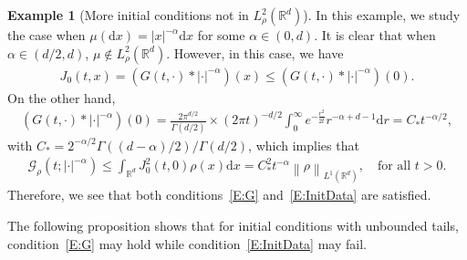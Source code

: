 \documentclass[a4paper,11pt]{article}%
\theoremstyle{plain}
\theoremstyle{definition}
\newtheorem{example}[theorem]{Example}
\numberwithin{equation}{section}
\newcommand{\R}{\mathbb{R}}
\newcommand{\Norm}[1]{\left\| #1 \right\|}
\newcommand{\ud}{\ensuremath{\mathrm{d}}}
\begin{document}
\begin{example}[More initial conditions not in $L_\rho^2 (\R^d)$]\label{Ex:Riesz}
  In this example, we study the case when $\mu(\ud x) = |x|^{-\alpha}\ud x$ for some $\alpha\in
  (0,d)$. It is clear that when $\alpha\in (d/2,d)$, $\mu\not\in L_\rho^2 (\R^d)$. However, in this
  case, we have
  \begin{align*}
    J_0(t,x) = \left(G(t,\cdot)* |\cdot|^{-\alpha}\right)(x)
    \le \left(G(t,\cdot)* |\cdot|^{-\alpha}\right)(0).
  \end{align*}
  On the other hand,
  \begin{align*}
    \left(G(t,\cdot)* |\cdot|^{-\alpha}\right)(0)
    = \frac{2\pi^{d/2}}{\Gamma(d/2)}\times (2\pi t)^{-d/2} \int_0^\infty e^{-\frac{r^2}{2t}} r^{-\alpha + d-1} \ud r = C_* t^{-\alpha/2},
  \end{align*}
  with $C_* = 2^{-\alpha/2}\Gamma\left((d-\alpha)/2\right)/\Gamma(d/2)$, which implies that
  \begin{align*}
    \mathcal{G}_\rho\left(t;|\cdot|^{-\alpha}\right)
    \le \int_{\R^d} J_0^2 (t,0) \rho(x) \ud x
    = C_*^2 t^{-\alpha} \Norm{\rho}_{L^1 (\R^d)},
    \quad \text{for all $t>0$.}
  \end{align*}
  Therefore, we see that both conditions~\eqref{E:G} and~\eqref{E:InitData} are satisfied.
\end{example}

The following proposition shows that for initial conditions with unbounded tails,
condition~\eqref{E:G} may hold while condition~\eqref{E:InitData} may fail.
\end{document}

